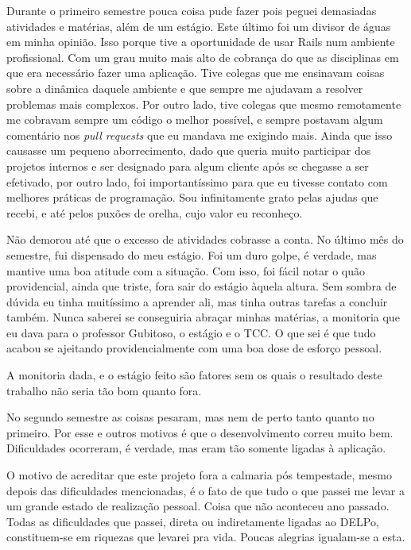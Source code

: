 Durante o primeiro semestre pouca coisa pude fazer pois peguei demasiadas atividades e matérias, além de um estágio. Este
último foi um divisor de águas em minha opinião. Isso porque tive a oportunidade de usar Rails num ambiente profissional.
Com um grau muito mais alto de cobrança do que as disciplinas em que era necessário fazer uma aplicação. Tive colegas que
me ensinavam coisas sobre a dinâmica daquele ambiente e que sempre me ajudavam a resolver problemas mais complexos. Por
outro lado, tive colegas que mesmo remotamente me cobravam sempre um código o melhor possível, e sempre postavam algum
comentário nos \emph{pull requests} que eu mandava me exigindo mais. Ainda que isso causasse um pequeno aborrecimento,
dado que queria muito participar dos projetos internos e ser designado para algum cliente após se chegasse a ser efetivado,
por outro lado, foi importantíssimo para que eu tivesse contato com melhores práticas de programação. Sou infinitamente
grato pelas ajudas que recebi, e até pelos puxões de orelha, cujo valor eu reconheço.

Não demorou até que o excesso de atividades cobrasse a conta.
No último mês do semestre, fui dispensado do meu estágio.
Foi um duro golpe, é verdade, mas mantive uma boa atitude com a situação.
Com isso, foi fácil notar o quão providencial, ainda que triste, fora sair do estágio àquela altura.
Sem sombra de dúvida eu tinha muitíssimo a aprender ali, mas tinha outras tarefas a concluir também.
Nunca saberei se conseguiria abraçar minhas matérias, a monitoria que eu dava para o professor Gubitoso, o estágio
e o TCC. O que sei é que tudo acabou se ajeitando providencialmente com uma boa dose de esforço pessoal.

A monitoria dada, e o estágio feito são fatores sem os quais o resultado deste trabalho não seria tão bom quanto fora.

No segundo semestre as coisas pesaram, mas nem de perto tanto quanto no primeiro. Por esse e outros motivos é que o
desenvolvimento correu muito bem. Dificuldades ocorreram, é verdade, mas eram tão somente ligadas à aplicação.

O motivo de acreditar que este projeto fora a calmaria pós tempestade, mesmo depois das dificuldades mencionadas, é o fato
de que tudo o que passei me levar a um grande estado de realização pessoal. Coisa que não aconteceu ano passado. Todas as
dificuldades que passei, direta ou indiretamente ligadas ao DELPo, constituem-se em riquezas que levarei pra vida.
Poucas alegrias igualam-se a esta.

